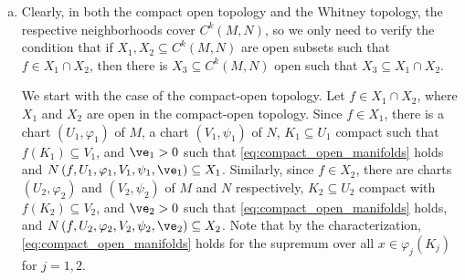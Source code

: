 \documentclass[10pt]{mypackage}
\begin{document}
\begin{solution}\hfill
  \begin{enumerate}[(a)]
    \item Clearly, in both the compact open topology and the Whitney topology, the respective neighborhoods cover $C^{k}\left( M,N \right)$, so we only need to verify the condition that if $X_1,X_2\subseteq C^{k}\left( M,N \right)$ are open subsets such that $f\in X_1\cap X_2$, then there is $X_3\subseteq C^{k}\left( M,N \right)$ open such that $X_3\subseteq X_1\cap X_2$.\newline

      We start with the case of the compact-open topology. Let $f\in X_1\cap X_2$, where $X_1$ and $X_2$ are open in the compact-open topology. Since $f\in X_1$, there is a chart $\left( U_1,\varphi_1 \right)$ of $M$, a chart $\left( V_1,\psi_1 \right)$ of $N$, $K_1\subseteq U_1$ compact such that $f\left( K_1 \right)\subseteq V_1$, and $\ve_1 > 0$ such that \eqref{eq:compact_open_manifolds} holds and $N\left( f,U_1,\varphi_1,V_1,\psi_1,\ve_1 \right) \subseteq X_1$. Similarly, since $f\in X_2$, there are charts $\left( U_2,\varphi_2 \right)$ and $\left( V_2,\psi_2 \right)$ of $M$ and $N$ respectively, $K_2\subseteq U_2$ compact with $f\left( K_2 \right)\subseteq V_2$, and $\ve_2 > 0$ such that \eqref{eq:compact_open_manifolds} holds, and $N\left( f,U_2,\varphi_2,V_2,\psi_2,\ve_2 \right)\subseteq X_2$. Note that by the characterization, \eqref{eq:compact_open_manifolds} holds for the supremum over all $x\in \varphi_j\left( K_j \right)$ for $j = 1,2$.
  \end{enumerate}
\end{solution}
\end{document}
